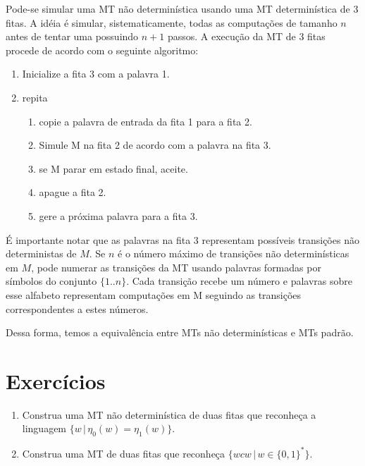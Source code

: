 \documentclass[a4paper]{article}
\theoremstyle{definition}
\begin{document}
  Pode-se simular uma MT não determinística usando uma MT determinística de 3
  fitas. A idéia é simular, sistematicamente, todas as computações de tamanho
  $n$ antes de tentar uma possuindo $n + 1$ passos. A execução da MT de 3 fitas
  procede de acordo com o seguinte algoritmo:
  \begin{enumerate}
    \item Inicialize a fita 3 com a palavra 1.
    \item repita 
    \begin{enumerate}
      \item copie a palavra de entrada da fita 1 para a fita 2.
      \item Simule M na fita 2 de acordo com a palavra na fita 3.
      \item se M parar em estado final, aceite.
      \item apague a fita 2.
      \item gere a próxima palavra para a fita 3.
    \end{enumerate}
  \end{enumerate}
  É importante notar que as palavras na fita 3 representam possíveis transições
  não deterministas de $M$. Se $n$ é o número máximo de transições não
  determinísticas em $M$, pode numerar as transições da MT usando palavras
  formadas por símbolos do conjunto $\{1..n\}$. Cada transição recebe um número
  e palavras sobre esse alfabeto representam computações em M seguindo as
  transições correspondentes a estes números.

  Dessa forma, temos a equivalência entre MTs não determinísticas e MTs padrão.

  \section{Exercícios}

  \begin{enumerate}
     \item Construa uma MT não determinística de duas fitas que reconheça a
       linguagem $\{w\,|\,\eta_0(w) = \eta_1(w)\}$.
     \item Construa uma MT de duas fitas que reconheça $\{wcw\,|\,w \in
       \{0,1\}^*\}$.
  \end{enumerate}
\end{document}
